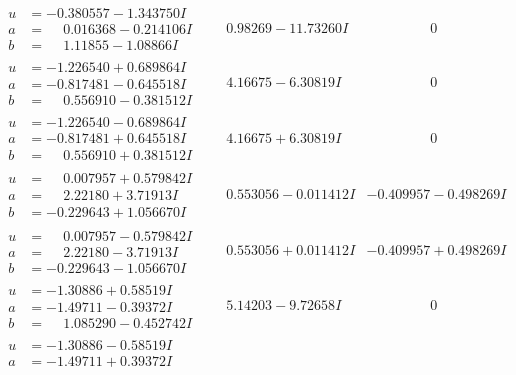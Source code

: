 \documentclass[1p]{elsarticle_modified}
\theoremstyle{definition}
\begin{document}
$$\begin{array}{c|c|c}
 \hline 
\begin{aligned}
u &= -0.380557 - 1.343750 I \\
a &= \phantom{-}0.016368 - 0.214106 I \\
b &= \phantom{-}1.11855 - 1.08866 I\end{aligned}
 & \phantom{-}0.98269 - 11.73260 I & \phantom{-0.000000 } 0 \\ \hline\begin{aligned}
u &= -1.226540 + 0.689864 I \\
a &= -0.817481 - 0.645518 I \\
b &= \phantom{-}0.556910 - 0.381512 I\end{aligned}
 & \phantom{-}4.16675 - 6.30819 I & \phantom{-0.000000 } 0 \\ \hline\begin{aligned}
u &= -1.226540 - 0.689864 I \\
a &= -0.817481 + 0.645518 I \\
b &= \phantom{-}0.556910 + 0.381512 I\end{aligned}
 & \phantom{-}4.16675 + 6.30819 I & \phantom{-0.000000 } 0 \\ \hline\begin{aligned}
u &= \phantom{-}0.007957 + 0.579842 I \\
a &= \phantom{-}2.22180 + 3.71913 I \\
b &= -0.229643 + 1.056670 I\end{aligned}
 & \phantom{-}0.553056 - 0.011412 I & -0.409957 - 0.498269 I \\ \hline\begin{aligned}
u &= \phantom{-}0.007957 - 0.579842 I \\
a &= \phantom{-}2.22180 - 3.71913 I \\
b &= -0.229643 - 1.056670 I\end{aligned}
 & \phantom{-}0.553056 + 0.011412 I & -0.409957 + 0.498269 I \\ \hline\begin{aligned}
u &= -1.30886 + 0.58519 I \\
a &= -1.49711 - 0.39372 I \\
b &= \phantom{-}1.085290 - 0.452742 I\end{aligned}
 & \phantom{-}5.14203 - 9.72658 I & \phantom{-0.000000 } 0 \\ \hline\begin{aligned}
u &= -1.30886 - 0.58519 I \\
a &= -1.49711 + 0.39372 I \\

\end{aligned}
\end{array}$$
\end{document}
